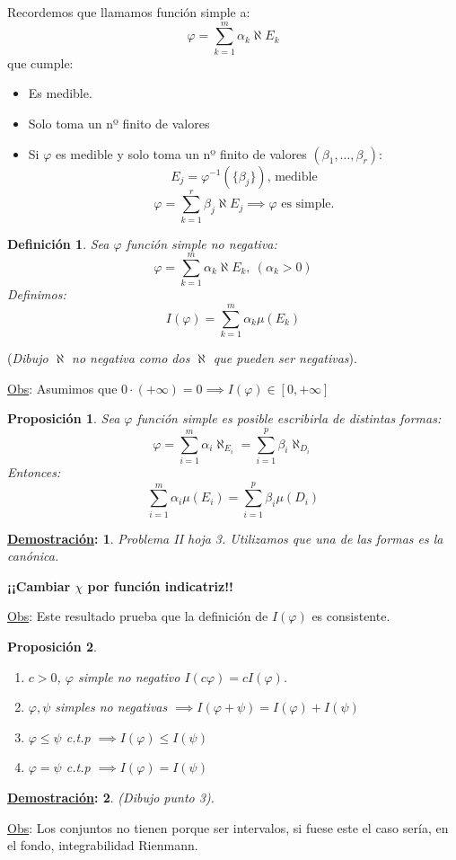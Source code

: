 \documentclass[10pt,a4paper,openright]{book}
\theoremstyle{break}
\newtheorem*{defi}{Definición}
\newtheorem*{prop}{Proposición}
\newtheorem*{demo}{\underline{Demostración}:}
\begin{document}
Recordemos que llamamos función simple a:
$$\varphi = \sum_{k=1}^{m} \alpha_k\aleph{E_k}$$
que cumple:
\begin{itemize}
    \item Es medible.
    \item Solo toma un nº finito de valores
    \item Si $\varphi$ es medible y solo toma un nº finito de valores $(\beta_1, \ldots, \beta_r)$:
    $$E_j = \varphi^{-1}\left(\{\beta_j\}\right) \text{, medible}$$
    $$\varphi = \sum_{k=1}^{r} \beta_j \aleph{E_j} \implies \varphi \text{ es simple.}$$
\end{itemize}

\begin{defi}
Sea $\varphi$ función simple no negativa:
$$\varphi = \sum_{k=1}^{m} \alpha_k \aleph{E_k},\ \left(\alpha_k > 0\right)$$
Definimos:
$$I\left(\varphi\right) = \sum_{k=1}^{m} \alpha_k \mu\left(E_k\right)$$
\end{defi}
(\textit{Dibujo $\aleph$ no negativa como dos $\aleph$ que pueden ser negativas}). 

\underline{Obs}:
Asumimos que $0 \cdot \left(+ \infty\right) = 0 \implies I\left(\varphi\right) \in \left[0, +\infty\right]$

\begin{prop}
Sea $\varphi$ función simple es posible escribirla de distintas formas:
$$\varphi = \sum_{i=1}^{m} \alpha_i \aleph_{E_i} = \sum_{i=1}^{p} \beta_i \aleph_{D_i}$$
Entonces:
$$\sum_{i=1}^{m} \alpha_i \mu\left(E_i\right) = \sum_{i=1}^{p} \beta_i \mu\left(D_i\right)$$
\end{prop}
\begin{demo}
Problema II hoja 3.
Utilizamos que una de las formas es la canónica.
\end{demo}
\textbf{¡¡Cambiar $\chi$ por función indicatriz!!}

\underline{Obs}:
Este resultado prueba que la definición de $I\left(\varphi\right)$ es consistente.

\begin{prop}
\begin{enumerate}
    \item $c > 0$, $\varphi$ simple no negativo $I\left(c\varphi\right) = cI\left(\varphi\right)$.
    \item $\varphi, \psi$ simples no negativas $\implies I\left(\varphi + \psi\right) = I\left(\varphi\right) + I\left(\psi\right)$
    \item $\varphi \le \psi$ c.t.p $\implies I\left(\varphi\right) \le I\left(\psi\right)$
    \item $\varphi = \psi$ c.t.p $\implies I\left(\varphi\right) = I\left(\psi\right)$
\end{enumerate}
\end{prop}
\begin{demo}
(\textit{Dibujo punto 3}). 
\end{demo}
\underline{Obs}:
Los conjuntos no tienen porque ser intervalos, si fuese este el caso sería, en el fondo, integrabilidad Rienmann.
\end{document}
